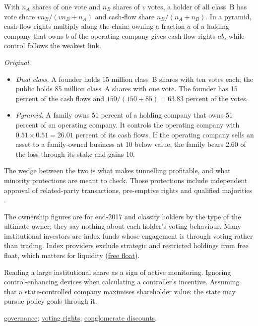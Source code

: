 \begin{qfdefinition}
 With $n_A$ shares of one vote and $n_B$ shares of $v$ votes, a holder of all class~B has vote share $vn_B/(vn_B+n_A)$ and cash-flow share $n_B/(n_A+n_B)$. In a pyramid, cash-flow rights multiply along the chain: owning a fraction $a$ of a holding company that owns $b$ of the operating company gives cash-flow rights $ab$, while control follows the weakest link.

 \emph{Original.}
\begin{itemize}
\item \emph{Dual class.} A founder holds 15 million class~B shares with ten votes each; the public holds 85 million class~A shares with one vote. The founder has 15 percent of the cash flows and $150/(150+85)=63.83$ percent of the votes.
\item \emph{Pyramid.} A family owns 51 percent of a holding company that owns 51 percent of an operating company. It controls the operating company with $0.51\times0.51=26.01$ percent of its cash flows. If the operating company sells an asset to a family-owned business at 10 below value, the family bears 2.60 of the loss through its stake and gains 10.
\end{itemize}
The wedge between the two is what makes tunnelling profitable, and what minority protections are meant to check. Those protections include independent approval of related-party transactions, pre-emptive rights and qualified majorities \citep[principles~II.F--II.G, pp.~19--21]{oecd-g20-principles-2023}.

 The ownership figures are for end-2017 and classify holders by the type of the ultimate owner; they say nothing about each holder's voting behaviour. Many institutional investors are index funds whose engagement is through voting rather than trading. Index providers exclude strategic and restricted holdings from free float, which matters for liquidity (\hyperref[def:equity-issuance-trading-liquidity]{free float}).

 Reading a large institutional share as a sign of active monitoring. Ignoring control-enhancing devices when calculating a controller's incentive. Assuming that a state-controlled company maximises shareholder value: the state may pursue policy goals through it.

 \hyperref[meth:corporate-governance-evaluation]{governance}; \hyperref[def:equity-rights-voting]{voting rights}; \hyperref[meth:valuation-approach-choice]{conglomerate discounts}.

\end{qfdefinition}

